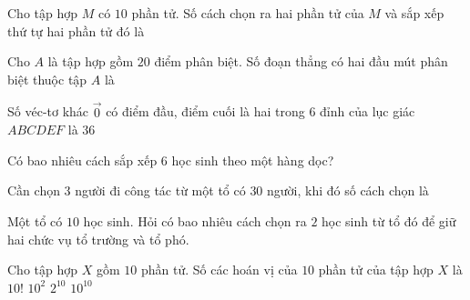 \begin{ex}%
Cho tập hợp $M$ có $10$ phần tử. Số cách chọn ra hai phần tử của $M$ và sắp xếp thứ tự hai phần tử đó là
\end{ex}
\begin{ex}%
    Cho $A$ là tập hợp gồm $20$ điểm phân biệt. Số đoạn thẳng có hai đầu mút phân biệt thuộc tập $A$ là
\end{ex}
\begin{ex}%
    Số véc-tơ khác $\overrightarrow{0}$ có điểm đầu, điểm cuối là hai trong 6 đỉnh của lục giác $ABCDEF$ là
    {$36$}
\end{ex}
\begin{ex}%
    Có bao nhiêu cách sắp xếp $6$ học sinh theo một hàng dọc?
\end{ex}
\begin{ex}%
    Cần chọn $3$ người đi công tác từ một tổ có $30$ người, khi đó số cách chọn là
\end{ex}
\begin{ex}%
    Một tổ có $10$ học sinh. Hỏi có bao nhiêu cách chọn ra $2$ học sinh từ tổ đó để giữ hai chức vụ tổ trường và tổ phó.
\end{ex}

\begin{ex}%
Cho tập hợp $X$ gồm $10$ phần tử. Số các hoán vị của $10$ phần tử của tập hợp $X$ là
\choice
{\True $10!$}
{$10^{2}$}
{$2^{10}$}
{$10^{10}$}
\end{ex}

